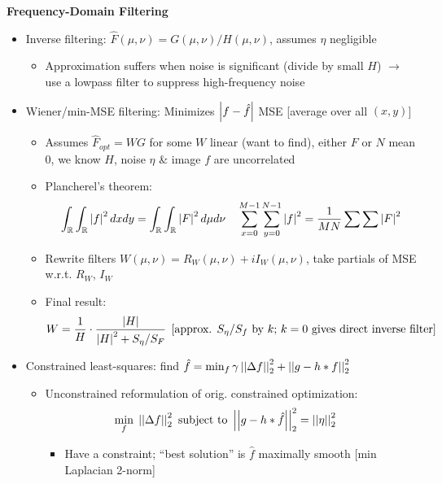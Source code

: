 \documentclass[12pt]{extarticle}
\begin{document}
\newp
\textbf{Frequency-Domain Filtering}
\begin{itemize}
    \item Inverse filtering: $\hat{F}(\mu,\nu)=G(\mu,\nu)/H(\mu,\nu)$, assumes $\eta$ negligible
    \begin{itemize}
        \item Approximation suffers when noise is significant (divide by small $H$) $\to$ use a lowpass filter to suppress high-frequency noise
    \end{itemize}
    \item Wiener/min-MSE filtering: Minimizes $\left|f-\hat{f}\right|$ MSE [average over all $(x,y)$] \begin{itemize}
        \item Assumes $\hat{F}_{opt}=WG$ for some $W$ linear (want to find), either $F$ or $N$ mean 0, we know $H$, noise $\eta$ \& image $f$ are uncorrelated
        \item Plancherel's theorem: \begin{align*}
            \int_{\mathbb{R}}\int_{\mathbb{R}}\left|f\right|^2dxdy=\int_{\mathbb{R}}\int_{\mathbb{R}}\left|F\right|^2d\mu d\nu\quad\sum_{x=0}^{M-1}\sum_{y=0}^{N-1}\left|f\right|^2=\frac{1}{MN}\sum\sum\left|F\right|^2
        \end{align*}
        \item Rewrite filters $W(\mu,\nu)=R_W(\mu,\nu)+iI_W(\mu,\nu)$, take partials of MSE w.r.t. $R_W$, $I_W$
        \item Final result: \begin{align*}
            W=\frac{1}{H}\cdot\frac{\left|H\right|}{\left|H\right|^2+S_\eta/S_F}\;\left[\text{approx. $S_\eta/S_f$ by $k$; $k=0$ gives direct inverse filter}\right]
        \end{align*}
    \end{itemize}
    \item Constrained least-squares: find $\hat{f}=\min_f\gamma\left|\left|\Delta f\right|\right|_2^2+\left|\left|g-h\ast f\right|\right|_2^2$ \begin{itemize}
        \item Unconstrained reformulation of orig. constrained optimization: \begin{align*}
            \min_f&\;\left|\left|\Delta f\right|\right|_2^2\text{ subject to }\left|\left|g-h\ast\hat{f}\right|\right|_2^2=\left|\left|\eta\right|\right|_2^2
        \end{align*}
        \begin{itemize}
            \item Have a constraint; ``best solution'' is $\hat{f}$ maximally smooth [min Laplacian 2-norm]
        \end{itemize}

\end{itemize}
\end{itemize}
\end{document}
